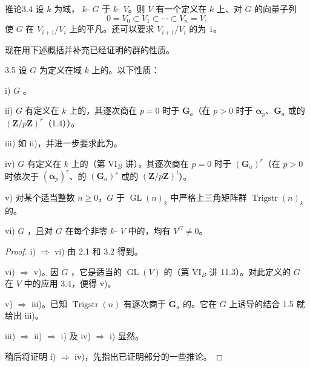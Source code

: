 \begin{SGAresult}{推论}{3.4}
设 $k$ 为域， $k$- $G$ 于 $k$- $V$。则 $V$ 有一个定义在 $k$ 上、对 $G$ 的向量子列
\[0=V_0\subset V_1\subset\cdots\subset V_n=V,\]
使 $G$ 在 $V_{i+1}/V_i$ 上的平凡。还可以要求 $V_{i+1}/V_i$ 的为 $1$。
\end{SGAresult}
现在用下述概括并补充已经证明的群的性质。
\begin{SGAresult}{}{3.5}
设 $G$ 为定义在域 $k$ 上的。以下性质：

i) $G$ 。

ii) $G$ 有定义在 $k$ 上的，其逐次商在 $p=0$ 时于 $\mathbf G_a$（在 $p>0$ 时于 $\boldsymbol\alpha_p$、$\mathbf G_a$ 或的 $(\mathbf Z/p\mathbf Z)^r$（1.4））。

iii) 如 ii)，并进一步要求此为。

iv) $G$ 有定义在 $k$ 上的（第 VI$_B$ 讲），其逐次商在 $p=0$ 时于 $(\mathbf G_a)^r$（在 $p>0$ 时依次于 $(\boldsymbol\alpha_p)^r$、的 $(\mathbf G_a)^s$ 或的 $(\mathbf Z/p\mathbf Z)^t$）。

v) 对某个适当整数 $n\geq0$，$G$ 于 $\operatorname{GL}(n)_k$ 中严格上三角矩阵群 $\operatorname{Trigstr}(n)_k$ 的。

vi) $G$ ，且对 $G$ 在每个非零 $k$- $V$ 中的，均有 $V^G\ne0$。
\end{SGAresult}
\begin{proof}
i) $\Rightarrow$ vi) 由 2.1 和 3.2 得到。

vi) $\Rightarrow$ v)。因 $G$ ，它是适当的 $\operatorname{GL}(V)$ 的（第 VI$_B$ 讲 11.3）。对此定义的 $G$ 在 $V$ 中的应用 3.4，便得 v)。

v) $\Rightarrow$ iii)。已知 $\operatorname{Trigstr}(n)$ 有逐次商于 $\mathbf G_a$ 的。它在 $G$ 上诱导的结合 1.5 就给出 iii)。

iii) $\Rightarrow$ ii) $\Rightarrow$ i) 及 iv) $\Rightarrow$ i) 显然。

稍后将证明 i) $\Rightarrow$ iv)，先指出已证明部分的一些推论。
\end{proof}
